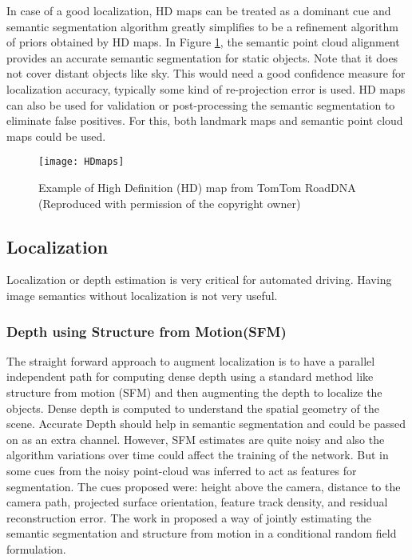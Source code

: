 \documentclass[conference]{IEEEtran}
\begin{document}
In case of a good localization, HD maps can be treated as a dominant cue and semantic segmentation algorithm greatly simplifies to be a refinement algorithm of priors obtained by HD maps. In Figure \ref{fig:HDmaps}, the semantic point cloud alignment provides an accurate semantic segmentation for static objects. Note that it does not cover distant objects like sky. This would need a good confidence measure for localization accuracy, typically some kind of re-projection error is used. HD maps can also be used for validation or post-processing the semantic segmentation to eliminate false positives. For this, both landmark maps and semantic point cloud maps could be used. 

\begin{figure}[!t]
\centering
\texttt{[image: HDmaps]}
\caption{Example of High Definition (HD) map from TomTom RoadDNA (Reproduced with permission of the copyright owner) }
\label{fig:HDmaps}
\end{figure}\subsection{Localization}
Localization or depth estimation is very critical for automated driving. Having image semantics without localization is not very useful. 

\subsubsection{Depth using Structure from Motion(SFM)}
The straight forward approach to augment localization is to have a parallel independent path for computing dense depth using a standard method like structure from motion (SFM) and then augmenting the depth to localize the objects. Dense depth is computed to understand the spatial geometry of the scene. Accurate Depth should help in semantic segmentation and could be passed on as an extra channel. However, SFM estimates are quite noisy and also the algorithm variations over time could affect the training of the network. But in \cite{brostow2008segmentation} some cues from the noisy point-cloud was inferred to act as features for segmentation. The cues proposed were: height above the  camera,  distance  to  the  camera  path,  projected surface orientation, feature track density, and residual reconstruction error. The work in\cite{kundu2014joint} proposed a way of jointly estimating the semantic segmentation and structure from motion in a conditional random field formulation.
\end{document}
